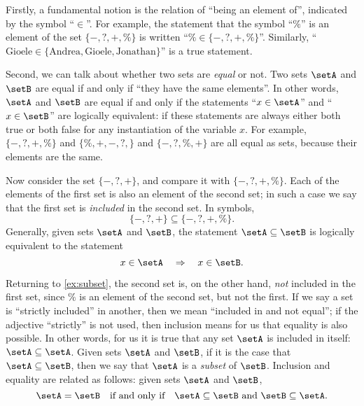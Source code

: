 {%

Firstly, a fundamental notion is the relation of ``being an element of'', indicated by the symbol ``$\in$''. For example, the statement that the symbol ``$\%$'' is an element of the set $\{ -, ?, +, \% \}$ is written ``$\% \in \{ -, ?, +, \% \}$''. Similarly, ``$\text{Gioele} \in \{ \text{Andrea}, \text{Gioele}, \text{Jonathan} \}$'' is a true statement. 

Second, we can talk about whether two sets are \emph{equal} or not. Two sets $\setA$ and $\setB$ are equal if and only if ``they have the same elements''. In other words, $\setA$ and $\setB$ are equal if and only if the statements
``$x \in \setA$'' and  ``$x \in \setB$'' are logically equivalent: if these statements are always either both true or both false for any instantiation of the variable $x$. For example, $\{ -, ?, +, \% \}$ and $\{ \%, +, -, ?, \}$ and $\{ -, ?, \%, + \}$ are all equal as sets, because their elements are the same. 

Now consider the set $\{ -, ?, + \}$, and compare it with $\{ -, ?, +, \% \}$. Each of the elements of the first set is also an element of the second set; in such a case we say that the first set is \emph{included} in the second set. In symbols,
\begin{equation}\label{ex:subset}
\{ -, ?, + \} \subseteq \{ -, ?, +, \% \}. 
\end{equation}
Generally, given sets $\setA$ and $\setB$, the statement $\setA \subseteq \setB$ is logically equivalent to the statement
\begin{equation}
x \in \setA \quad \Rightarrow \quad  x \in \setB.
\end{equation}

Returning to \cref{ex:subset}, the second set is, on the other hand, \emph{not} included in the first set, since $\%$ is an element of the second set, but not the first. If we say a set is ``strictly included'' in another, then we mean ``included in and not equal''; if the adjective ``strictly'' is not used, then inclusion means for us that equality is also possible. In other words, for us it is true that any set $\setA$ is included in itself: $\setA \subseteq \setA$. Given sets $\setA$ and $\setB$, if it is the case that $\setA \subseteq \setB$, then we say that $\setA$ is a \emph{subset} of $\setB$. Inclusion and equality are related as follows: given sets $\setA$ and $\setB$, 
\begin{equation}
\setA = \setB \quad \text{if and only if} \quad \setA \subseteq \setB \ \text{and} \ \setB \subseteq \setA.
\end{equation}

}
